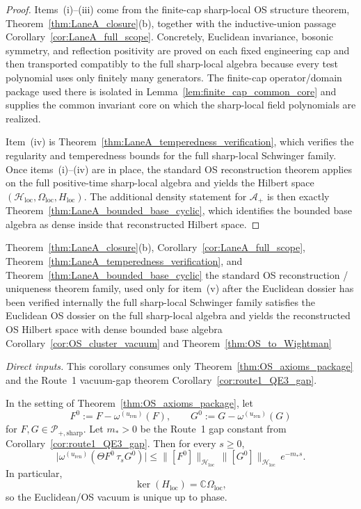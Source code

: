 \begin{proof}
Items~(i)--(iii) come from the finite-cap sharp-local OS structure theorem, Theorem~\ref{thm:LaneA_closure}(b), together with the inductive-union passage Corollary~\ref{cor:LaneA_full_scope}. Concretely, Euclidean invariance, bosonic symmetry, and reflection positivity are proved on each fixed engineering cap and then transported compatibly to the full sharp-local algebra because every test polynomial uses only finitely many generators. The finite-cap operator/domain package used there is isolated in Lemma~\ref{lem:finite_cap_common_core} and supplies the common invariant core on which the sharp-local field polynomials are realized.

Item~(iv) is Theorem~\ref{thm:LaneA_temperedness_verification}, which verifies the regularity and temperedness bounds for the full sharp-local Schwinger family. Once items~(i)--(iv) are in place, the standard OS reconstruction theorem applies on the full positive-time sharp-local algebra and yields the Hilbert space $(\mathcal H_{\mathrm{loc}},\Omega_{\mathrm{loc}},H_{\mathrm{loc}})$. The additional density statement for $\mathcal A_+$ is then exactly Theorem~\ref{thm:LaneA_bounded_base_cyclic}, which identifies the bounded base algebra as dense inside that reconstructed Hilbert space.
\end{proof}

\dependencyledger
  {Theorem~\ref{thm:LaneA_closure}(b), Corollary~\ref{cor:LaneA_full_scope}, Theorem~\ref{thm:LaneA_temperedness_verification}, and Theorem~\ref{thm:LaneA_bounded_base_cyclic}}
  {the standard OS reconstruction / uniqueness theorem family, used only for item~(v) after the Euclidean dossier has been verified internally}
  {the full sharp-local Schwinger family satisfies the Euclidean OS dossier on the full sharp-local algebra and yields the reconstructed OS Hilbert space with dense bounded base algebra}
  {Corollary~\ref{cor:OS_cluster_vacuum} and Theorem~\ref{thm:OS_to_Wightman}}

\noindent\emph{Direct inputs.} This corollary consumes only Theorem~\ref{thm:OS_axioms_package} and the Route~1 vacuum-gap theorem Corollary~\ref{cor:route1_QE3_gap}.\par

\begin{corollary}\label{cor:OS_cluster_vacuum}
In the setting of Theorem~\ref{thm:OS_axioms_package}, let
\[
F^0:=F-\omega^{(u_{\mathrm{ren}})}(F),\qquad G^0:=G-\omega^{(u_{\mathrm{ren}})}(G)
\]
for $F,G\in\mathcal P_{+,\mathrm{sharp}}$.
Let $m_*>0$ be the Route~1 gap constant from Corollary~\ref{cor:route1_QE3_gap}.
Then for every $s\ge 0$,
\[
\big|\omega^{(u_{\mathrm{ren}})}(\Theta F^0\,\tau_s G^0)\big|
\le
\|[F^0]\|_{\mathcal H_{\mathrm{loc}}}\,\|[G^0]\|_{\mathcal H_{\mathrm{loc}}}\,e^{-m_* s}.
\]
In particular,
\[
\ker(H_{\mathrm{loc}})=\mathbb C\Omega_{\mathrm{loc}},
\]
so the Euclidean/OS vacuum is unique up to phase.
\end{corollary}

